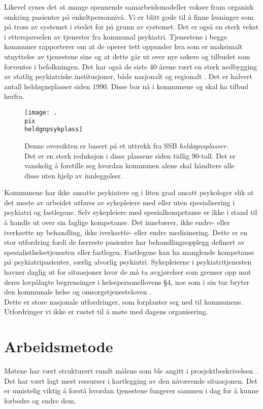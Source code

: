 \documentclass[11pt]{report} %
\begin{document}
    Likevel synes det at mange spennende samarbeidsmodeller vokser fram organisk omkring pasienter på enkeltpersonnivå. Vi er blitt gode til å finne løsninger som på tross av systemet i stedet for på grunn av systemet.
    Det er også en sterk vekst i etterspørselen av tjenester fra kommunal psykiatri. Tjenestene i begge kommuner rapporterer om at de operer tett oppunder hva som er maksimalt utnyttelse av tjenestene sine og at dette går ut over nye søkere og tilbudet som forventes i befolkningen.
    Det har også de siste 40 årene vært en sterk nedbygging av statlig psykiatriske institusjoner, både nasjonalt og regionalt
    \cite{SSButtrekk1}. Det er halvert antall heldøgnsplasser siden 1990. Disse bor nå i kommunene og skal ha tilbud herfra. 

  \begin{figure}[ht]
    \centering
    \texttt{[image: .\\pix\\heldgnpsykplass]}
    \caption[Oversikt over reduksjon i  \textit{heldøgnsplasser}.]
     {Denne oversikten er basert på et uttrekk fra SSB \textit{heldøgnsplasser}. Det er en sterk reduksjon i disse plassene siden tidlig 90-tall. Det er vanskelig å forstille seg hvordan kommunen alene skal håndtere alle disse uten hjelp av innleggelser.}
  \end{figure}


      Kommunene har ikke ansatte psykiatere og i liten grad ansatt psykologer slik at det meste av arbeidet utføres av sykepleiere med eller uten spesialisering i psykiatri og fastlegene. Selv sykepleiere med spesialkompetanse er ikke i stand til å handle ut over sin faglige kompetanse. Det innebærer, ikke endre- eller iverksette ny behandling, ikke iverksette- eller endre medisinering. Dette er en stor utfordring fordi de færreste pasienter har behandlingsopplegg definert av spesialisthelsetjenesten eller fastlegen. Fastlegene kan ha manglende kompetanse på psykiatripasienter, særlig alvorlig psykiatri. 
      Sykepleierne i psykiatritjenesten havner daglig ut for situasjoner hvor de må ta avgjørelser som grenser opp mot deres lovpålagte begrensinger i helsepersonellovens §4, noe som i sin tur bryter den kommunale helse og omsorgstjenesteloven
      \cite{HOTJL-12}.\\
      Dette er store nasjonale utfordringer, som forplanter seg ned til kommunene. Utfordringer vi ikke er rustet til å møte med dagens organisering. \\

  \chapter{Arbeidsmetode}\label{chap:meto}
    Møtene har vært strukturert rundt målene som ble angitt i prosjektbeskrivelsen
    \cite{ProPlan-1}. Det har vært lagt mest ressurser i kartlegging av den nåværende situasjonen. Det er umistelig viktig å forstå hvordan tjenestene fungerer sammen i dag for å kunne forbedre og endre dem.\\
\end{document}
